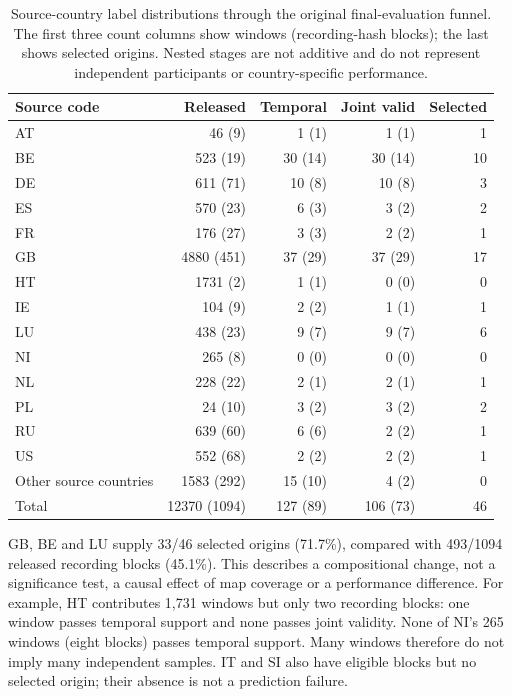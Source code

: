 \documentclass[11pt]{article}
\begin{document}
\begin{table}[htbp]
\centering\small
\caption{Source-country label distributions through the original final-evaluation funnel. The first three count columns show windows (recording-hash blocks); the last shows selected origins. Nested stages are not additive and do not represent independent participants or country-specific performance.}
\label{tab:final-cohort-geography}
\begin{tabular}{@{}lrrrr@{}}
\toprule
Source code & Released & Temporal & Joint valid & Selected\\
\midrule
AT & 46 (9) & 1 (1) & 1 (1) & 1\\
BE & 523 (19) & 30 (14) & 30 (14) & 10\\
DE & 611 (71) & 10 (8) & 10 (8) & 3\\
ES & 570 (23) & 6 (3) & 3 (2) & 2\\
FR & 176 (27) & 3 (3) & 2 (2) & 1\\
GB & 4880 (451) & 37 (29) & 37 (29) & 17\\
HT & 1731 (2) & 1 (1) & 0 (0) & 0\\
IE & 104 (9) & 2 (2) & 1 (1) & 1\\
LU & 438 (23) & 9 (7) & 9 (7) & 6\\
NI & 265 (8) & 0 (0) & 0 (0) & 0\\
NL & 228 (22) & 2 (1) & 2 (1) & 1\\
PL & 24 (10) & 3 (2) & 3 (2) & 2\\
RU & 639 (60) & 6 (6) & 2 (2) & 1\\
US & 552 (68) & 2 (2) & 2 (2) & 1\\
Other source countries & 1583 (292) & 15 (10) & 4 (2) & 0\\
Total & 12370 (1094) & 127 (89) & 106 (73) & 46\\
\bottomrule
\end{tabular}
\end{table}

GB, BE and LU supply 33/46 selected origins (71.7\%), compared with 493/1094
released recording blocks (45.1\%). This describes a compositional change,
not a significance test, a causal effect of map coverage or a performance
difference. For example, HT contributes 1,731 windows but only two recording
blocks: one window passes temporal support and none passes joint validity.
None of NI's 265 windows (eight blocks) passes temporal support.
Many windows therefore do not imply many independent samples.
IT and SI also have eligible blocks but no selected origin; their absence
is not a prediction failure.
\end{document}
